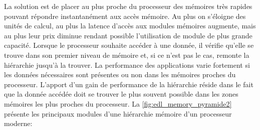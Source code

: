         La solution est de placer au plus proche du processeur des mémoires très rapides pouvant répondre instantanément aux accès mémoire. Au plus on s'éloigne des unités de calcul, au plus la latence d'accès aux modules mémoires augmente, mais au plus leur prix diminue rendant possible l'utilisation de module de plus grande capacité. Lorsque le processeur souhaite accéder à une donnée, il vérifie qu'elle se trouve dans son premier niveau de mémoire et, si ce n'est pas le cas, remonte la hiérarchie jusqu'à la trouver. La performance des applications varie fortement si les données nécessaires sont présentes ou non dans les mémoires proches du processeur. L'apport d'un gain de performance de la hiérarchie réside dans le fait que la donnée accédée doit se trouver le plus souvent possible dans les zones mémoires les plus proches du processeur. La \autoref{fig:edl_memory_pyramide2} présente les principaux modules d'une hiérarchie mémoire d'un processeur moderne:
